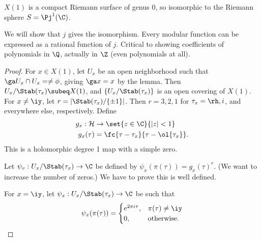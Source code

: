 \begin{thm}
$X(1)$ is a compact Riemann surface of genus 0, so isomorphic to the Riemann sphere $S=\Pj^1(\C)$.
\end{thm}
We will show that $j$ gives the isomorphism. Every modular function can be expressed as a rational function of $j$.
Critical to showing coefficients of polynomials in $\Q$, actually in $\Z$ (even polynomials at all).
\begin{proof}
For $x\in X(1)$, let $U_x$ be an open neighborhood such that $\ga U_x\cap U_x=\ne \phi$, giving $\ga x=x$ by the lemma. Then $U_x/\Stab(\tau_x)\subeq X(1)$, and $\{U_x/\Stab(\tau_x)\}$ is an open covering of $X(1)$. For $x\ne \iy$, let $r=|\Stab(\tau_x)/\{\pm 1\}|$. Then $r=3,2,1$ for $\tau_x=\rh,i$, and everywhere else, respectively. Define
\begin{align*}
g_x:\cal H&\to \set{z\in \C}{|z|<1}\\
g_x(\tau)&=\fc{\tau-\tau_x}{\tau-\ol{\tau_x}}.
\end{align*}
This is a holomorphic degree 1 map with a simple zero. %

Let $\psi_v:U_x/\Stab(\tau_x)\to \C$ be defined by $\psi_x(\pi(\tau))=g_x(\tau)^r$. (We want to increase the number of zeros.) We have to prove this is well defined.

For $x=\iy$, let $\psi_x:U_x/\Stab(\tau_x)\to \C$ be such that 
\[
\psi_x(\pi(\tau))
=\begin{cases}
e^{2\pi i\tau},&\pi(\tau)\ne \iy\\
0,&\text{otherwise.}
\end{cases}
\]


\end{proof}
